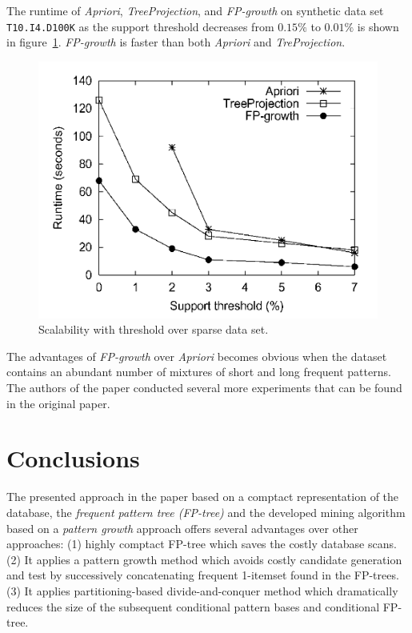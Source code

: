 \documentclass[12pt, a4paper]{article}
\newcommand{\code}[1]{\texttt{#1}}
\begin{document}
\newpage

The runtime of \textit{Apriori}, \textit{TreeProjection}, and \textit{FP-growth} on synthetic data set \code{T10.I4.D100K} as the support threshold decreases from $0.15\%$ to $0.01\%$ is shown in figure~\ref{fig:runtime}. \textit{FP-growth} is faster than both \textit{Apriori} and \textit{TreProjection}.

\begin{figure}[H]
  \includegraphics[scale=0.5]{fp-tree-runtime}
  \centering
  \caption{Scalability with threshold over sparse data set.}
  \label{fig:runtime}
\end{figure}

The advantages of \textit{FP-growth} over \textit{Apriori} becomes obvious when the dataset contains an abundant number of mixtures of short and long frequent patterns. The authors of the paper conducted several more experiments that can be found in the original paper.

\section{Conclusions}

The presented approach in the paper based on a comptact representation of the database, the \textit{frequent pattern tree (FP-tree)} and the developed mining algorithm based on a \textit{pattern growth} approach offers several advantages over other approaches: (1) highly comptact FP-tree which saves the costly database scans. (2) It applies a pattern growth method which avoids costly candidate generation and test by successively concatenating frequent 1-itemset found in the FP-trees. (3) It applies partitioning-based divide-and-conquer method which dramatically reduces the size of the subsequent conditional  pattern bases and conditional FP-tree.
\end{document}
